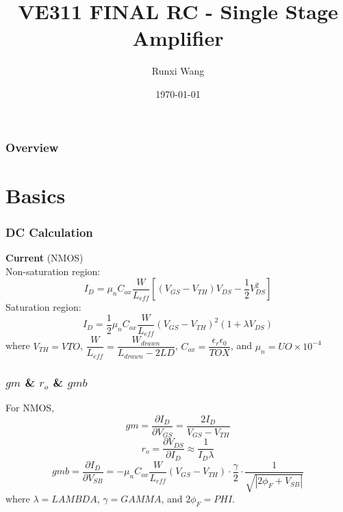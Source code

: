\documentclass{beamer}
\title[Short title]{VE311 FINAL RC - Single Stage Amplifier} %
\author{Runxi Wang} %
\institute[UN-SJTU JI] %
{
UM-SJTU JI \\ %
\medskip
\textit{wangrunxi@sjtu.edu.cn} %
}
\date{\today} %
\begin{document}
\begin{frame}
\titlepage %
\end{frame}

\begin{frame}
\frametitle{Overview} %
\tableofcontents %
\end{frame}

\section{Basics}
\begin{frame}
    \frametitle{DC Calculation}
    \textbf{Current} (NMOS)\\
    Non-saturation region:
    \begin{equation*}
        \boxed{I_D = \mu_nC_{ox}\frac{W}{L_{eff}}\left[ (V_{GS}-V_{TH})V_{DS} -\frac{1}{2}V_{DS}^2\right]}
    \end{equation*}
    Saturation region:
    \begin{equation*}
        \boxed{I_D = \frac{1}{2}\mu_nC_{ox}\frac{W}{L_{eff}}(V_{GS}-V_{TH})^2(1+\lambda V_{DS})}
    \end{equation*}
    where $V_{TH} = VTO$, $\dfrac{W}{L_{eff}} = \dfrac{W_{drawn}}{L_{drawn}-2LD}$, $C_{ox} = \dfrac{\epsilon_r\epsilon_0}{TOX}$, and $\mu_n = UO\times 10^{-4}$
\end{frame}

\begin{frame}
    \frametitle{$gm$ \& $r_o$ \& $gmb$}
    For NMOS, 
    \begin{equation*}
            \boxed{gm = \frac{\partial I_D}{\partial V_{GS}} = \frac{2I_D}{V_{GS}-V_{TH}}}
    \end{equation*}
    \begin{equation*}
            \boxed{r_o = \frac{\partial V_{DS}}{\partial I_D} \approx \frac{1}{I_D\lambda}}
    \end{equation*}
    \begin{equation*}
            \boxed{gmb = \frac{\partial I_D}{\partial V_{SB}} = -\mu_n C_{ox} \frac{W}{L_{eff}}(V_{GS}-V_{TH})\cdot \frac{\gamma}{2}\cdot \frac{1}{\sqrt{|2\phi_F+V_{SB}|}}}
    \end{equation*}
    where $\lambda = LAMBDA$, $\gamma = GAMMA$, and $2\phi_F = PHI$. 
\end{frame}
\end{document}
